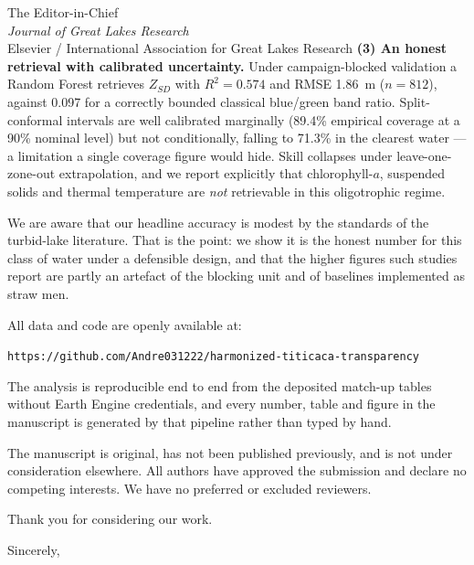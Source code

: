 \documentclass[11pt]{letter}
\begin{document}
\begin{letter}{The Editor-in-Chief\\ \textit{Journal of Great Lakes Research}\\
Elsevier / International Association for Great Lakes Research}
\textbf{(3) An honest retrieval with calibrated uncertainty.} Under
campaign-blocked validation a Random Forest retrieves $Z_{SD}$ with
$R^2=0.574$ and RMSE 1.86~m ($n=812$), against 0.097 for a correctly bounded
classical blue/green band ratio. Split-conformal intervals are well calibrated
marginally (89.4\% empirical coverage at a 90\% nominal level) but not
conditionally, falling to 71.3\% in the clearest water --- a limitation a
single coverage figure would hide. Skill collapses under leave-one-zone-out
extrapolation, and we report explicitly that chlorophyll-$a$, suspended solids
and thermal temperature are \emph{not} retrievable in this oligotrophic
regime.

We are aware that our headline accuracy is modest by the standards of the
turbid-lake literature. That is the point: we show it is the honest number for
this class of water under a defensible design, and that the higher figures such
studies report are partly an artefact of the blocking unit and of baselines
implemented as straw men.

All data and code are openly available at:

\smallskip
\noindent\texttt{https://github.com/Andre031222/harmonized-titicaca-transparency}
\smallskip

\noindent The analysis is reproducible end to end from the deposited match-up
tables without Earth Engine credentials, and every number, table and figure in
the manuscript is generated by that pipeline rather than typed by hand.

The manuscript is original, has not been published previously, and is not under
consideration elsewhere. All authors have approved the submission and declare
no competing interests. We have no preferred or excluded reviewers.

Thank you for considering our work.

\closing{Sincerely,}
\end{letter}
\end{document}
